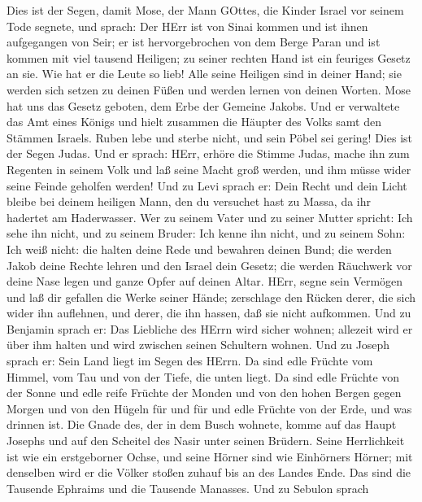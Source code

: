  Dies ist der Segen, damit Mose, der Mann GOttes, die Kinder
Israel vor seinem Tode segnete,  und sprach: Der HErr ist
von Sinai kommen und ist ihnen aufgegangen von Seir; er ist
hervorgebrochen von dem Berge Paran und ist kommen mit viel tausend
Heiligen; zu seiner rechten Hand ist ein feuriges Gesetz an sie.
 Wie hat er die Leute so lieb! Alle seine Heiligen sind in
deiner Hand; sie werden sich setzen zu deinen Füßen und werden lernen
von deinen Worten.  Mose hat uns das Gesetz geboten, dem
Erbe der Gemeine Jakobs.  Und er verwaltete das Amt eines
Königs und hielt zusammen die Häupter des Volks samt den Stämmen
Israels.  Ruben lebe und sterbe nicht, und sein Pöbel sei
gering!  Dies ist der Segen Judas. Und er sprach: HErr,
erhöre die Stimme Judas, mache ihn zum Regenten in seinem Volk und laß
seine Macht groß werden, und ihm müsse wider seine Feinde geholfen
werden!  Und zu Levi sprach er: Dein Recht und dein Licht
bleibe bei deinem heiligen Mann, den du versuchet hast zu Massa, da ihr
hadertet am Haderwasser.  Wer zu seinem Vater und zu seiner
Mutter spricht: Ich sehe ihn nicht, und zu seinem Bruder: Ich kenne ihn
nicht, und zu seinem Sohn: Ich weiß nicht: die halten deine Rede und
bewahren deinen Bund;  die werden Jakob deine Rechte lehren
und den Israel dein Gesetz; die werden Räuchwerk vor deine Nase legen
und ganze Opfer auf deinen Altar.  HErr, segne sein
Vermögen und laß dir gefallen die Werke seiner Hände; zerschlage den
Rücken derer, die sich wider ihn auflehnen, und derer, die ihn hassen,
daß sie nicht aufkommen.  Und zu Benjamin sprach er: Das
Liebliche des HErrn wird sicher wohnen; allezeit wird er über ihm halten
und wird zwischen seinen Schultern wohnen.  Und zu Joseph
sprach er: Sein Land liegt im Segen des HErrn. Da sind edle Früchte vom
Himmel, vom Tau und von der Tiefe, die unten liegt.  Da
sind edle Früchte von der Sonne und edle reife Früchte der Monden
 und von den hohen Bergen gegen Morgen und von den Hügeln
für und für  und edle Früchte von der Erde, und was drinnen
ist. Die Gnade des, der in dem Busch wohnete, komme auf das Haupt
Josephs und auf den Scheitel des Nasir unter seinen Brüdern.
 Seine Herrlichkeit ist wie ein erstgeborner Ochse, und
seine Hörner sind wie Einhörners Hörner; mit denselben wird er die
Völker stoßen zuhauf bis an des Landes Ende. Das sind die Tausende
Ephraims und die Tausende Manasses.  Und zu Sebulon sprach

